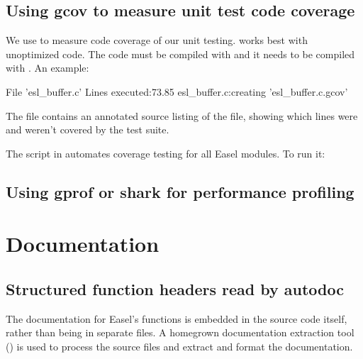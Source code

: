 \subsection{Using gcov to measure unit test code coverage}

We use  to measure code coverage of our unit
testing.  works best with unoptimized code.  The code
must be compiled with  and it needs to be compiled with
. An example:

\begin{cchunk}
  File 'esl_buffer.c'
  Lines executed:73.85%
  esl_buffer.c:creating 'esl_buffer.c.gcov'
\end{cchunk}

The file  contains an annotated source listing
of the  file, showing which lines were and weren't covered
by the test suite.

The  script in  automates coverage
testing for all Easel modules. To run it:

\begin{cchunk} 
\end{cchunk}


\subsection{Using gprof or shark for performance profiling}



\section{Documentation}

\subsection{Structured function headers read by autodoc}
The documentation for Easel's functions is embedded in the source code
itself, rather than being in separate files. A homegrown documentation
extraction tool () is used to process the source files
and extract and format the documentation.

